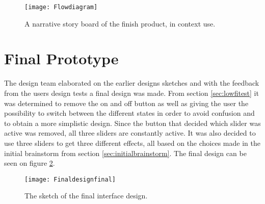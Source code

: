 \begin{figure}[!h] 
\centering
\texttt{[image: Flowdiagram]}
\caption{\label{fig:Flowdiagram} A narrative story board of the finish product,  in context use.}
\end{figure}

\section{Final Prototype}\label{sec:finaldesign final}
The design team elaborated on the earlier designs sketches and with the feedback from the users design tests a final design was made. From section \ref{sec:lowfitest} it was determined to remove the on and off button as well as giving the user the possibility to switch between the different states in order to avoid confusion and to obtain a more simplistic design. Since the button that decided which slider was active was removed, all three sliders are constantly active. It was also decided to use three sliders to get three different effects, all based on the choices made in the initial brainstorm from section \ref{sec:initialbrainstorm}. The final design can be seen on figure \ref{fig:finaldesignsketch3grey}.

\begin{figure}[!h] 
\centering
\texttt{[image: Finaldesignfinal]}
\caption{\label{fig:finaldesignsketch3grey} The sketch of the final interface design.}
\end{figure}  








